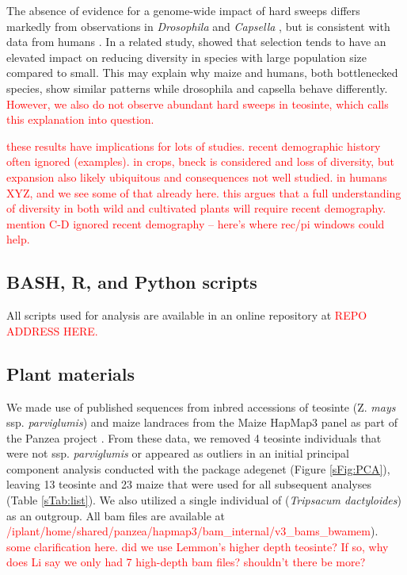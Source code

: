 \documentclass{pnastwo}
\newcommand{\jri}[1]{\textcolor{red}{\scriptsize #1}}
\begin{document}
\begin{article}
The absence of evidence for a genome-wide impact of hard sweeps differs markedly from observations in \emph{Drosophila} \cite{sattath2011} and \emph{Capsella} \cite{williamson2014}, but is consistent with data from humans \cite{hernandez2011,pritchard2010genetics}. 
In a related study, \cite{corbett2015} showed that selection tends to have an elevated impact on reducing diversity in species with large population size compared to small. This may explain why maize and humans, both bottlenecked species, show similar patterns while drosophila and capsella behave differently. \textcolor{red}{However, we also do not observe abundant hard sweeps in teosinte, which calls this explanation into question.}

\jri{these results have implications for lots of studies. recent demographic history often ignored (examples). in crops, bneck is considered and loss of diversity, but expansion also likely ubiquitous and consequences not well studied.  in humans XYZ, and we see some of that already here. this argues that a full understanding of diversity in both wild and cultivated plants will require recent demography. mention C-D ignored recent demography -- here's where rec/pi windows could help.}



\begin{materials} %

\subsection{BASH, R, and Python scripts}
All scripts used for analysis are available in an online repository at \textcolor{red}{REPO ADDRESS HERE.} 

\subsection{Plant materials}
We made use of published sequences from inbred accessions of teosinte (Z. \emph{mays} ssp. \emph{parviglumis}) and maize landraces from the Maize HapMap3 panel as part of the Panzea project  \cite{chia2012, lemmon2014, hapmap3}. 
From these data, we removed 4 teosinte individuals that were not ssp. \emph{parviglumis} or appeared as outliers in an initial principal component analysis conducted with the package adegenet \cite{jombart2011} (Figure \ref{sFig:PCA}), leaving 13 teosinte and 23 maize that were used for all subsequent analyses (Table \ref{sTab:list}). We also utilized a single individual of (\emph{Tripsacum dactyloides}) as an outgroup.  All bam files are available at \textcolor{red}{/iplant/home/shared/panzea/hapmap3/bam\_internal/v3\_bams\_bwamem}). \jri{some clarification here. did we use Lemmon's higher depth teosinte? If so, why does Li say we only had 7 high-depth bam files?  shouldn't there be more?}


\end{materials}
\end{article}
\end{document}
